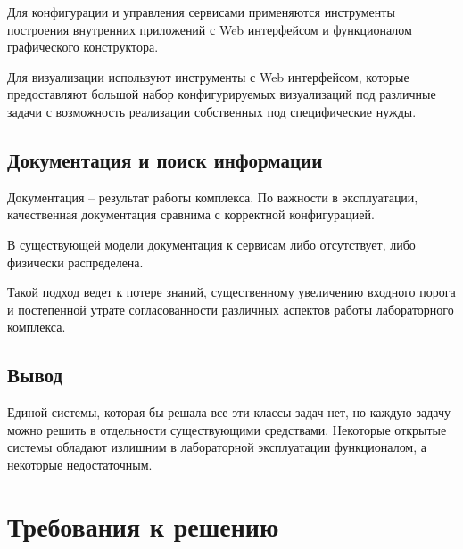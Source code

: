 \documentclass[../thesis.tex]{subfiles}
\begin{document}
	Для конфигурации и управления сервисами применяются инструменты построения внутренних приложений
	с Web интерфейсом и функционалом графического конструктора.

	Для визуализации используют инструменты с Web интерфейсом, которые предоставляют большой набор конфигурируемых
	визуализаций под различные задачи с возможность реализации собственных под специфические нужды.

	\subsection{Документация и поиск информации}

	Документация -- результат работы комплекса. По важности в эксплуатации, качественная документация
	сравнима с корректной конфигурацией.

	В существующей модели документация к сервисам либо отсутствует, либо физически распределена.

	Такой подход ведет к потере знаний, существенному увеличению входного порога и постепенной утрате
	согласованности различных аспектов работы лабораторного комплекса.

	\subsection{Вывод}

	Единой системы, которая бы решала все эти классы задач нет, но каждую задачу можно решить в
	отдельности существующими средствами. Некоторые открытые системы обладают излишним в лабораторной
	эксплуатации функционалом, а некоторые недостаточным.

	\section{Требования к решению}
\end{document}

